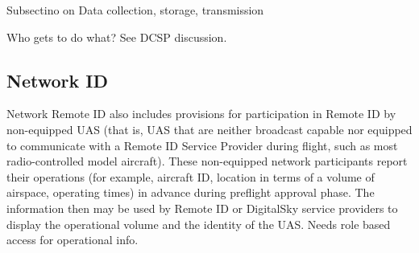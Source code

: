 \documentclass{ua_wgs_base}
\begin{document}
\begin{lyxgreyedout}
Subsectino on Data collection, storage, transmission

Who gets to do what? See DCSP discussion.%
\end{lyxgreyedout}


\subsection{Network ID}

 Network Remote ID also includes provisions for participation in
Remote ID by non-equipped   UAS (that is, UAS that are neither broadcast
capable nor equipped to communicate with a Remote ID Service Provider
during flight, such as most radio-controlled model aircraft). These
non-equipped network participants report their operations (for example,
aircraft ID, location in terms of a volume of airspace, operating
times) in advance during preflight approval phase. The information
then may be used by Remote ID or DigitalSky service providers to display
the operational volume and the identity of the UAS. Needs role based
access for operational info. 
\end{document}
